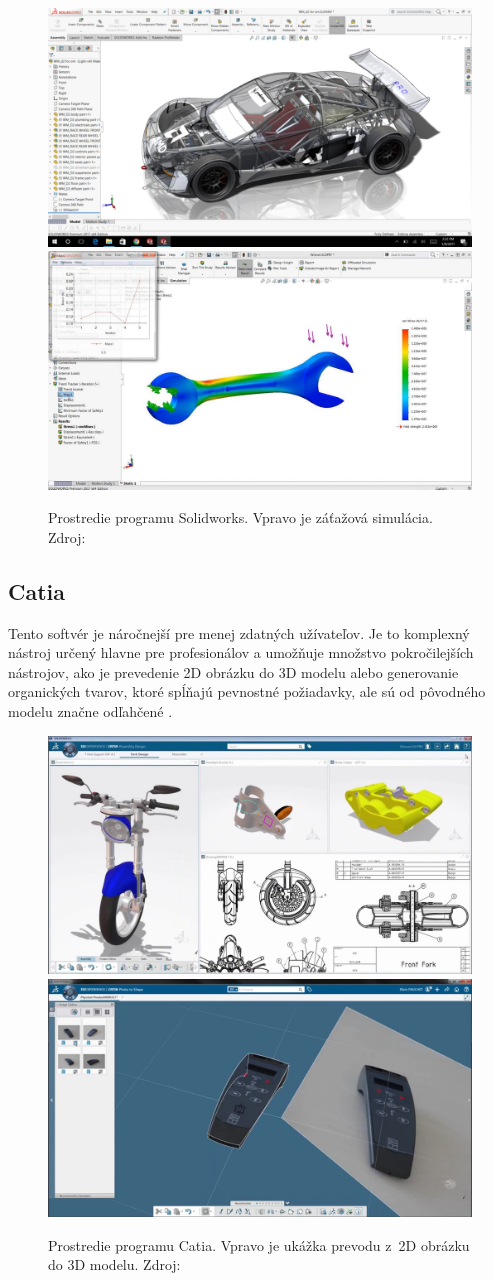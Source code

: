 \begin{figure}[H]
    \centering
    \includegraphics[width = 0.49\linewidth]{obrazky-figures/programs/solidworks_01.png}
    \includegraphics[width = 0.49\linewidth]{obrazky-figures/programs/solidworks, simulation.jpg}
    \caption{Prostredie programu Solidworks. Vpravo je záťažová simulácia. Zdroj: \cite{solidworks_2017} \cite{ames_2017} }
    \label{fig:solidworks_simulations}
\end{figure}


\subsection*{Catia}
Tento softvér je náročnejší pre menej zdatných užívateľov. Je to komplexný nástroj určený hlavne pre profesionálov a umožňuje množstvo pokročilejších nástrojov, ako je prevedenie 2D obrázku do 3D modelu alebo generovanie organických tvarov, ktoré spĺňajú pevnostné požiadavky, ale sú od pôvodného modelu značne odľahčené \cite{technodat_cz_2017}.

\begin{figure}[H]
    \centering
    \includegraphics[width = 0.49\linewidth]{obrazky-figures/programs/Catia.jpg}
    \includegraphics[width = 0.49\linewidth]{obrazky-figures/programs/Catia2.png}
    \caption{Prostredie programu Catia. Vpravo je ukážka prevodu z~2D obrázku do 3D modelu. Zdroj: \cite{technodat_cz_2017} }
    \label{fig:Catia}
\end{figure}


